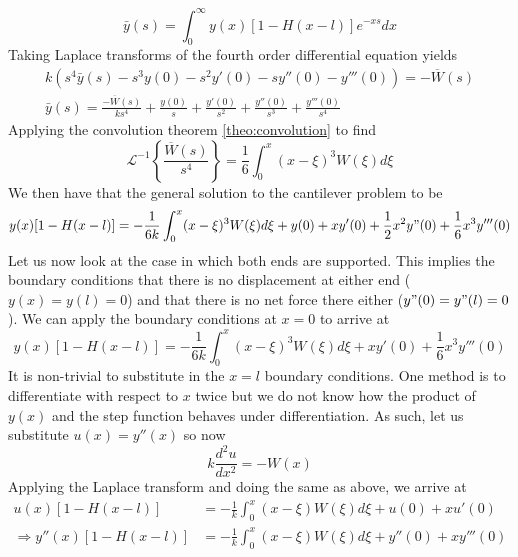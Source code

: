 \documentclass{report}
\theoremstyle{definition}
\theoremstyle{remark}
\newcommand{\inlt}[1]{\mathscr{L}^{-1} \left\{ #1 \right\}}
\newcommand{\odt}[2]{\frac{d^2 #1}{d#2^2}}
\begin{document}
\begin{equation*}
    \bar{y}(s) = \int^\infty_0y(x)[1-H(x-l)]e^{-xs}dx
\end{equation*}
Taking Laplace transforms of the fourth order differential equation yields 
\begin{equation*}
    \begin{split}
        k(s^4\bar y(s) -s^3 y(0) -s^2y'(0) -sy''(0) - y'''(0)) = -\overline W(s)\\ \bar y(s) = \frac{-\overline W (s)}{ks^4}+\frac{y(0)}{s}+\frac{y'(0)}{s^2}+\frac{y''(0)}{s^3} + \frac{y'''(0)}{s^4}
    \end{split}
\end{equation*}
Applying the convolution theorem \ref{theo:convolution} to find 
\begin{equation*}
    \inlt{\frac{\overline W (s)}{s^4}} = \frac{1}{6}\int^x_0(x-\xi)^3W(\xi)d\xi
\end{equation*}
We then have that the general solution to the cantilever problem to be 
\begin{equation*}
    y(x)[1-H(x-l)] = -\frac{1}{6k}\int^x_0(x-\xi)^3W(\xi)d\xi +y(0) + xy'(0)+\frac{1}{2}x^2y"(0)+\frac{1}{6}x^3y'''(0)
\end{equation*}
Let us now look at the case in which both ends are supported. This implies the boundary conditions that there is no displacement at either end ($y(x)=y(l)=0$) and that there is no net force there either ($y"(0)=y"(l)=0$). We can apply the boundary conditions at $x=0$ to arrive at 
\begin{equation*}
    y(x)[1-H(x-l)] = -\frac{1}{6k}\int^x_0(x-\xi)^3W(\xi)d\xi + xy'(0)+\frac{1}{6}x^3y'''(0)
\end{equation*}
It is non-trivial to substitute in the $x=l$ boundary conditions. One method is to differentiate with respect to $x$ twice but we do not know how the product of $y(x)$ and the step function behaves under differentiation. As such, let us substitute $u(x)=y''(x)$ so now 
\begin{equation*}
    k\odt{u}{x} = - W(x)
\end{equation*}
Applying the Laplace transform and doing the same as above, we arrive at 
\begin{equation*}
    \begin{split}
        u(x)[1-H(x-l)] &= -\frac{1}{k}\int^x_0(x-\xi)W(\xi)d\xi + u(0)+xu'(0) \\
        \Rightarrow  y''(x)[1-H(x-l)] &= -\frac{1}{k}\int^x_0(x-\xi)W(\xi)d\xi + y''(0)+xy'''(0)
    \end{split}
\end{equation*}
\end{document}
